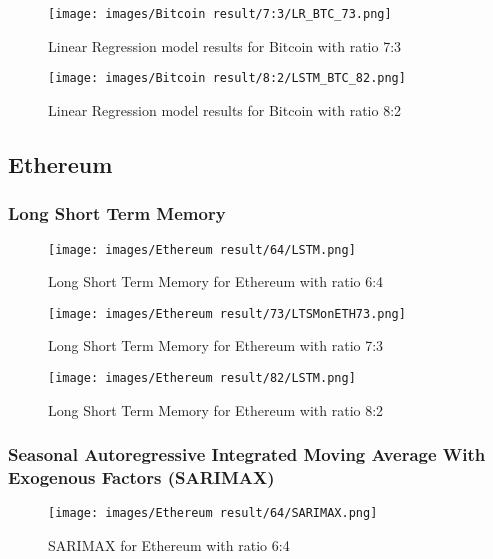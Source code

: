 \documentclass{ieeeojies}
\begin{document}
\begin{figure}[H]
  \centering
\texttt{[image: images/Bitcoin result/7:3/LR\_BTC\_73.png]}\\
  \caption{Linear Regression model results for Bitcoin with ratio 7:3}
  \label{fig:lr_btc_73}
\end{figure}

\begin{figure}[H]
  \centering
\texttt{[image: images/Bitcoin result/8:2/LSTM\_BTC\_82.png]}
  \caption{Linear Regression model results for Bitcoin with ratio 8:2}
  \label{fig:lr_btc_82}
\end{figure}

\subsection{Ethereum}

\subsubsection{Long Short Term Memory}
\begin{figure}[H]
  \centering
\texttt{[image: images/Ethereum result/64/LSTM.png]}\\
  \caption{Long Short Term Memory for Ethereum with ratio 6:4}
  \label{fig:lstm_eth_64}
\end{figure}

\begin{figure}[H]
  \centering
\texttt{[image: images/Ethereum result/73/LTSMonETH73.png]}\\
  \caption{Long Short Term Memory for Ethereum with ratio 7:3}
  \label{fig:lstm_eth_73}
\end{figure}

\begin{figure}[H]
  \centering
\texttt{[image: images/Ethereum result/82/LSTM.png]}\\
  \caption{Long Short Term Memory for Ethereum with ratio 8:2}
  \label{fig:lstm_eth_82}
\end{figure}


\subsubsection{Seasonal Autoregressive Integrated
Moving Average With Exogenous Factors
(SARIMAX)}
\begin{figure}[H]
  \centering
\texttt{[image: images/Ethereum result/64/SARIMAX.png]}\\
  \caption{SARIMAX for Ethereum with ratio 6:4}
  \label{fig:sarimax_eth_64}
\end{figure}
\end{document}
